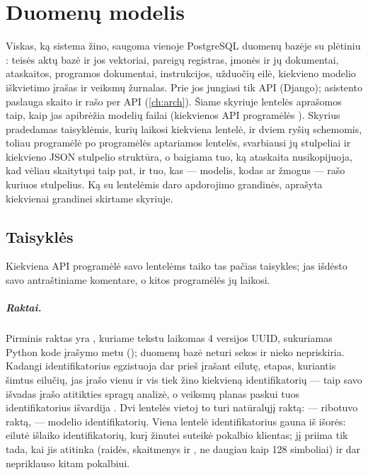 \chapter{Duomenų modelis}\label{ch:data}

Viskas, ką sistema žino, saugoma vienoje PostgreSQL duomenų bazėje su plėtiniu :
teisės aktų bazė ir jos vektoriai, pareigų registras, įmonės ir jų dokumentai, ataskaitos,
programos dokumentai, instrukcijos, užduočių eilė, kiekvieno modelio iškvietimo įrašas ir
veiksmų žurnalas. Prie jos jungiasi tik API (Django); asistento paslauga skaito ir rašo per API
(\cref{ch:arch}). Šiame skyriuje lentelės aprašomos taip, kaip jas apibrėžia modelių failai
(kiekvienos API programėlės ). Skyrius pradedamas taisyklėmis, kurių
laikosi kiekviena lentelė, ir dviem ryšių schemomis, toliau programėlė po programėlės
aptariamos lentelės, svarbiausi jų stulpeliai ir kiekvieno JSON stulpelio struktūra, o baigiama
tuo, ką ataskaita nusikopijuoja, kad vėliau skaitytųsi taip pat, ir tuo, kas --- modelis, kodas
ar žmogus --- rašo kuriuos stulpelius. Ką su lentelėmis daro apdorojimo grandinės, aprašyta
kiekvienai grandinei skirtame skyriuje.

\section{Taisyklės}\label{sec:data:conventions}

Kiekviena API programėlė savo lentelėms taiko tas pačias taisykles;  jas
išdėsto savo antraštiniame komentare, o kitos programėlės jų laikosi.

\paragraph{Raktai.} Pirminis raktas yra , kuriame tekstu laikomas 4 versijos
UUID, sukuriamas Python kode įrašymo metu (); duomenų bazė neturi
sekos ir nieko nepriskiria. Kadangi identifikatorius egzistuoja dar prieš įrašant eilutę,
etapas, kuriantis šimtus eilučių, jas įrašo vienu  ir vis tiek žino kiekvieną
identifikatorių --- taip savo išvadas įrašo atitikties spragų analizė, o veiksmų planas paskui
tuos identifikatorius išvardija . Dvi lentelės vietoj to turi natūralųjį
raktą:  --- ribotuvo raktą,  --- modelio
identifikatorių. Viena lentelė identifikatorius gauna iš išorės:  eilutė
išlaiko identifikatorių, kurį žinutei suteikė pokalbio klientas;  jį
priima tik tada, kai jis atitinka  (raidės, skaitmenys ir , ne
daugiau kaip 128 simboliai) ir dar nepriklauso kitam pokalbiui.

